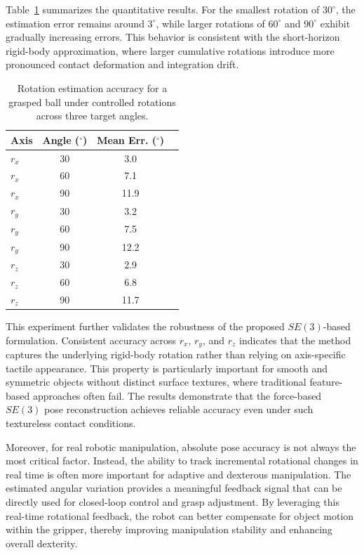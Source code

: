 \documentclass[letterpaper,10pt,journal,twoside]{IEEEtran}
\begin{document}
Table~\ref{tab:rotation_accuracy} summarizes the quantitative results. For the smallest rotation of $30^\circ$, the estimation error remains around $3^\circ$, while larger rotations of $60^\circ$ and $90^\circ$ exhibit gradually increasing errors. This behavior is consistent with the short-horizon rigid-body approximation, where larger cumulative rotations introduce more pronounced contact deformation and integration drift.

\begin{table}[ht]
    \centering
    \caption{Rotation estimation accuracy for a grasped ball under controlled rotations across three target angles.}
    \label{tab:rotation_accuracy}
    \begin{tabular}{lccc}
        \toprule
        Axis & Angle ($^\circ$) & Mean Err. ($^\circ$) \\
        \midrule
        $r_x$ & 30 & 3.0 \\
        $r_x$ & 60 & 7.1 \\
        $r_x$ & 90 & 11.9 \\
        \midrule
        $r_y$ & 30 & 3.2 \\
        $r_y$ & 60 & 7.5 \\
        $r_y$ & 90 & 12.2 \\
        \midrule
        $r_z$ & 30 & 2.9 \\
        $r_z$ & 60 & 6.8 \\
        $r_z$ & 90 & 11.7 \\
        \bottomrule
    \end{tabular}
\end{table}

This experiment further validates the robustness of the proposed $SE(3)$-based formulation. Consistent accuracy across $r_x$, $r_y$, and $r_z$ indicates that the method captures the underlying rigid-body rotation rather than relying on axis-specific tactile appearance. This property is particularly important for smooth and symmetric objects without distinct surface textures, where traditional feature-based approaches often fail. The results demonstrate that the force-based $SE(3)$ pose reconstruction achieves reliable accuracy even under such textureless contact conditions.

Moreover, for real robotic manipulation, absolute pose accuracy is not always the most critical factor. Instead, the ability to track incremental rotational changes in real time is often more important for adaptive and dexterous manipulation. The estimated angular variation provides a meaningful feedback signal that can be directly used for closed-loop control and grasp adjustment. By leveraging this real-time rotational feedback, the robot can better compensate for object motion within the gripper, thereby improving manipulation stability and enhancing overall dexterity.
\end{document}
